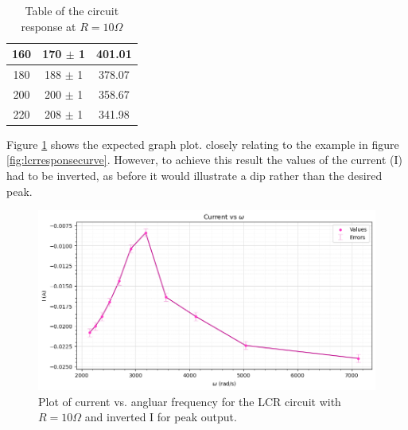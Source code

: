 \documentclass[12pt]{article}
\begin{document}
\begin{table}[H]
{\begin{tabular}{|c|c|c|}
        160                                                                    & 170 $\pm$ 1                                                                     & 401.01                                               \\ \hline
        180                                                                    & 188 $\pm$ 1                                                                     & 378.07                                               \\ \hline
        200                                                                    & 200 $\pm$ 1                                                                     & 358.67                                               \\ \hline
        220                                                                    & 208 $\pm$ 1                                                                     & 341.98                                               \\ \hline
        \end{tabular}

    }

    \caption{\centering Table of the circuit response at $R= 10 \Omega$}
    \label{tab:3}

\end{table}

Figure \ref{fig:angfreqI} shows the expected graph plot. closely relating to the example in figure \ref{fig:lcrresponsecurve}. However, to achieve this result the values of the current (I) had to be inverted,
as before it would illustrate a dip rather than the desired peak.

\begin{figure}[H]
    \centering
    \includegraphics[width=\textwidth]{angfreqI.png}
    \caption{\centering Plot of current vs. angluar frequency for the LCR circuit with $R = 10 \Omega$ and inverted I for peak output.}
    \label{fig:angfreqI}
\end{figure}
\end{document}
